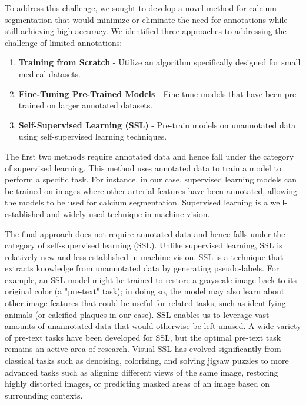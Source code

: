 \documentclass[a4paper,11pt,oneside]{report}
\begin{document}
To address this challenge, we sought to develop a novel method for calcium segmentation that would minimize or eliminate the need for annotations while still achieving high accuracy. We identified three approaches to addressing the challenge of limited annotations: 
\begin{enumerate}
    \item \textbf{Training from Scratch} - Utilize an algorithm specifically designed for small medical datasets.
    \item \textbf{Fine-Tuning Pre-Trained Models} - Fine-tune models that have been pre-trained on larger annotated datasets.
    \item \textbf{Self-Supervised Learning (SSL)} - Pre-train models on unannotated data using self-supervised learning techniques.
\end{enumerate}
The first two methods require annotated data and hence fall under the category of supervised learning. This method uses annotated data to train a model to perform a specific task. For instance, in our case, supervised learning models can be trained on images where other arterial features have been annotated, allowing the models to be used for calcium segmentation. Supervised learning is a well-established and widely used technique in machine vision. 

The final approach does not require annotated data and hence falls under the category of self-supervised learning (SSL). Unlike supervised learning, SSL is relatively new and less-established in machine vision. SSL is a technique that extracts knowledge from unannotated data by generating pseudo-labels. For example, an SSL model might be trained to restore a grayscale image back to its original color (a "pre-text" task); in doing so, the model may also learn about other image features that could be useful for related tasks, such as identifying animals (or calcified plaques in our case). SSL enables us to leverage vast amounts of unannotated data that would otherwise be left unused. A wide variety of pre-text tasks have been developed for SSL, but the optimal pre-text task remains an active area of research. Visual SSL has evolved significantly from classical tasks such as denoising, colorizing, and solving jigsaw puzzles to more advanced tasks such as aligning different views of the same image, restoring highly distorted images, or predicting masked areas of an image based on surrounding contexts. 
\end{document}
